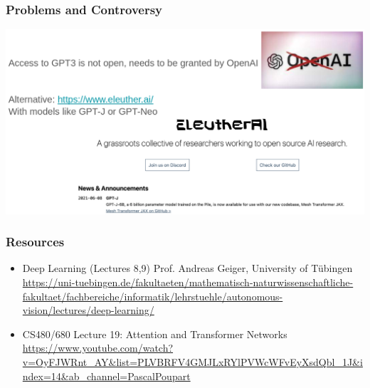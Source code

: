 \documentclass[10pt]{beamer}
\begin{document}
\begin{frame}
  \frametitle{Problems and Controversy}
\begin{center}
	\includegraphics[width=\columnwidth]{images/pr4}
\end{center}
\end{frame}


\begin{frame}
  \frametitle{Resources}

\begin{itemize}
\setlength\itemsep{1em}
\item Deep Learning (Lectures 8,9) Prof. Andreas Geiger, University of T\"ubingen
{\scriptsize{\url{https://uni-tuebingen.de/fakultaeten/mathematisch-naturwissenschaftliche-fakultaet/fachbereiche/informatik/lehrstuehle/autonomous-vision/lectures/deep-learning/}}}
\item CS480/680 Lecture 19: Attention and Transformer Networks
{\scriptsize{\url{https://www.youtube.com/watch?v=OyFJWRnt_AY&list=PLVBRFV4GMJLxRYlPVWcWFvEyXsdQbl_1J&index=14&ab_channel=PascalPoupart}}}
\end{itemize}
\end{frame}





\end{document}
